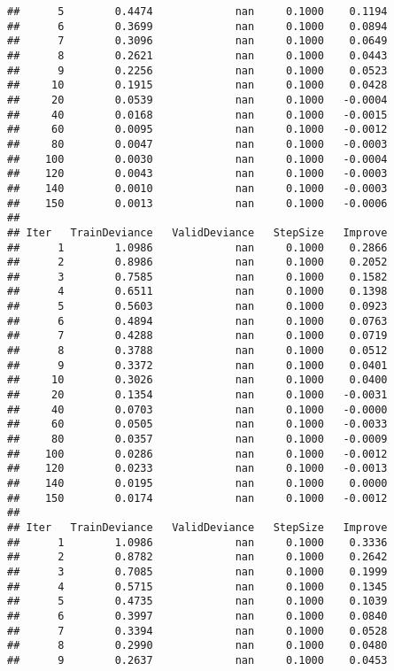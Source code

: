 \documentclass[
]{article}
\begin{document}
\begin{verbatim}
##      5        0.4474             nan     0.1000    0.1194
##      6        0.3699             nan     0.1000    0.0894
##      7        0.3096             nan     0.1000    0.0649
##      8        0.2621             nan     0.1000    0.0443
##      9        0.2256             nan     0.1000    0.0523
##     10        0.1915             nan     0.1000    0.0428
##     20        0.0539             nan     0.1000   -0.0004
##     40        0.0168             nan     0.1000   -0.0015
##     60        0.0095             nan     0.1000   -0.0012
##     80        0.0047             nan     0.1000   -0.0003
##    100        0.0030             nan     0.1000   -0.0004
##    120        0.0043             nan     0.1000   -0.0003
##    140        0.0010             nan     0.1000   -0.0003
##    150        0.0013             nan     0.1000   -0.0006
## 
## Iter   TrainDeviance   ValidDeviance   StepSize   Improve
##      1        1.0986             nan     0.1000    0.2866
##      2        0.8986             nan     0.1000    0.2052
##      3        0.7585             nan     0.1000    0.1582
##      4        0.6511             nan     0.1000    0.1398
##      5        0.5603             nan     0.1000    0.0923
##      6        0.4894             nan     0.1000    0.0763
##      7        0.4288             nan     0.1000    0.0719
##      8        0.3788             nan     0.1000    0.0512
##      9        0.3372             nan     0.1000    0.0401
##     10        0.3026             nan     0.1000    0.0400
##     20        0.1354             nan     0.1000   -0.0031
##     40        0.0703             nan     0.1000   -0.0000
##     60        0.0505             nan     0.1000   -0.0033
##     80        0.0357             nan     0.1000   -0.0009
##    100        0.0286             nan     0.1000   -0.0012
##    120        0.0233             nan     0.1000   -0.0013
##    140        0.0195             nan     0.1000    0.0000
##    150        0.0174             nan     0.1000   -0.0012
## 
## Iter   TrainDeviance   ValidDeviance   StepSize   Improve
##      1        1.0986             nan     0.1000    0.3336
##      2        0.8782             nan     0.1000    0.2642
##      3        0.7085             nan     0.1000    0.1999
##      4        0.5715             nan     0.1000    0.1345
##      5        0.4735             nan     0.1000    0.1039
##      6        0.3997             nan     0.1000    0.0840
##      7        0.3394             nan     0.1000    0.0528
##      8        0.2990             nan     0.1000    0.0480
##      9        0.2637             nan     0.1000    0.0453

\end{verbatim}
\end{document}
